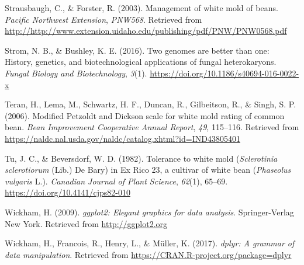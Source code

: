 \documentclass[fleqn,10pt,lineno]{wlpeerj} %
\theoremstyle{definition}
\theoremstyle{definition}
\theoremstyle{definition}
\theoremstyle{remark}
\begin{document}
\hypertarget{ref-strausbaugh2003management}{}
Strausbaugh, C., \& Forster, R. (2003). Management of white mold of
beans. \emph{Pacific Northwest Extension}, \emph{PNW568}. Retrieved from
\url{http://http://www.extension.uidaho.edu/publishing/pdf/PNW/PNW0568.pdf}

\hypertarget{ref-strom2016genomes}{}
Strom, N. B., \& Bushley, K. E. (2016). Two genomes are better than one:
History, genetics, and biotechnological applications of fungal
heterokaryons. \emph{Fungal Biology and Biotechnology}, \emph{3}(1).
\url{https://doi.org/10.1186/s40694-016-0022-x}

\hypertarget{ref-teran2006modified}{}
Teran, H., Lema, M., Schwartz, H. F., Duncan, R., Gilbeitson, R., \&
Singh, S. P. (2006). Modified Petzoldt and Dickson scale for white mold
rating of common bean. \emph{Bean Improvement Cooperative Annual
Report}, \emph{49}, 115--116. Retrieved from
\url{https://naldc.nal.usda.gov/naldc/catalog.xhtml?id=IND43805401}

\hypertarget{ref-tu1982tolerance}{}
Tu, J. C., \& Beversdorf, W. D. (1982). Tolerance to white mold
(\emph{Sclerotinia sclerotiorum} (Lib.) De Bary) in Ex Rico 23, a
cultivar of white bean (\emph{Phaseolus vulgaris} L.). \emph{Canadian
Journal of Plant Science}, \emph{62}(1), 65--69.
\url{https://doi.org/10.4141/cjps82-010}

\hypertarget{ref-ggplot2}{}
Wickham, H. (2009). \emph{ggplot2: Elegant graphics for data analysis}.
Springer-Verlag New York. Retrieved from \url{http://ggplot2.org}

\hypertarget{ref-dplyr}{}
Wickham, H., Francois, R., Henry, L., \& Müller, K. (2017). \emph{dplyr:
A grammar of data manipulation}. Retrieved from
\url{https://CRAN.R-project.org/package=dplyr}
\end{document}
